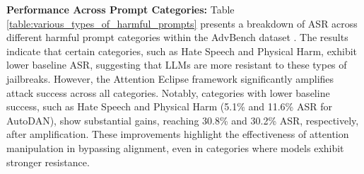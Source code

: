 \begin{table*}[t]
\centering
{}
\caption{Performance of the amplified attacks against baseline attacks for different categories of AdvBench dataset on Llama2-7b-chat model.}
\label{table:various_types_of_harmful_prompts}
\end{table*}





\noindent \textbf{Performance Across Prompt Categories:} Table \ref{table:various_types_of_harmful_prompts} presents a breakdown of ASR across different harmful prompt categories within the AdvBench dataset \cite{ding2023wolf}. The results indicate that certain categories, such as Hate Speech and Physical Harm, exhibit lower baseline ASR, suggesting that LLMs are more resistant to these types of jailbreaks. However, the Attention Eclipse framework significantly amplifies attack success across all categories. Notably, categories with lower baseline success, such as Hate Speech and Physical Harm (5.1\% and 11.6\% ASR for AutoDAN), show substantial gains, reaching 30.8\% and 30.2\% ASR, respectively, after amplification. These improvements highlight the effectiveness of attention manipulation in bypassing alignment, even in categories where models exhibit stronger resistance. \\



